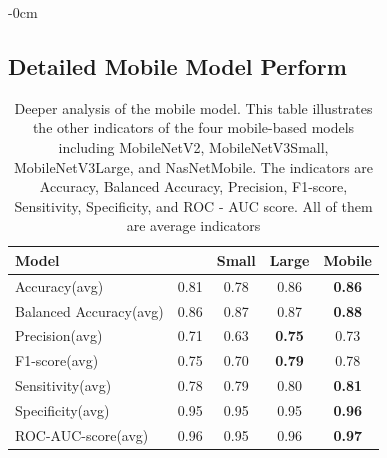 \documentclass[sensors,article,submit,pdftex,moreauthors]{Definitions/mdpi}
\begin{document}
\begin{adjustwidth}{-\extralength}{0cm}
		\subsection[\appendixname~\thesection]{Detailed Mobile Model Perform}
		\begin{table}[H]
			\centering	
			\begin{tabular}{|l | c | c | c | c|} 
				\hline
				Model & \cite{04381} & \cite{02244}Small & \cite{02244}Large & \cite{07012}Mobile\\
				\hline
				Accuracy(avg) & 0.81 & 0.78 & 0.86 & \textbf{0.86}\\
				\hline
				Balanced Accuracy(avg) & 0.86 & 0.87 & 0.87 & \textbf{0.88}\\ 
				\hline
				Precision(avg) & 0.71 & 0.63 & \textbf{0.75} & 0.73\\
				\hline
				F1-score(avg) & 0.75 & 0.70 & \textbf{0.79} & 0.78\\
				\hline
				Sensitivity(avg) & 0.78 & 0.79 & 0.80 & \textbf{0.81}\\ 
				\hline
				Specificity(avg) & 0.95 & 0.95 & 0.95 & \textbf{0.96}\\
				\hline
				ROC-AUC-score(avg) & 0.96 & 0.95 & 0.96 & \textbf{0.97}\\
				\hline
			\end{tabular}
			\caption{Deeper analysis of the mobile model. This table illustrates the other indicators of the four mobile-based models including MobileNetV2, MobileNetV3Small, MobileNetV3Large, and NasNetMobile. The indicators are Accuracy, Balanced Accuracy, Precision, F1-score, Sensitivity, Specificity, and ROC - AUC score. All of them are average indicators}
			\label{appendix-table:mobile-performance}
		\end{table} 
		
		
		
		
		

\end{adjustwidth}
\end{document}
